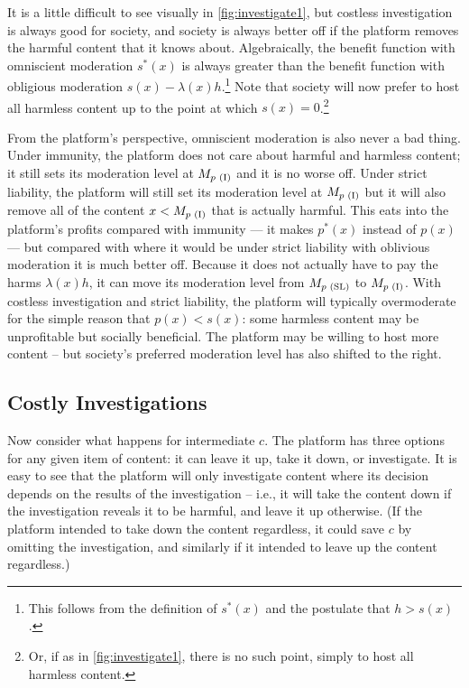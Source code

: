 It is a little difficult to see visually in \autoref{fig:investigate1}, but costless investigation is always good for society, and society is always better off if the platform removes the harmful content that it knows about. Algebraically, the  benefit function with omniscient moderation $s^*(x)$  is always greater than the benefit function with obligious moderation $s(x) - \lambda(x)h$.\footnote{This follows from the definition of $s^*(x)$ and the postulate that $h > s(x)$.} Note that society will now prefer to host all harmless content up to the point at which $s(x) = 0$.\footnote{Or, if as in \ref{fig:investigate1}, there is no such point, simply to host all harmless content.}

From the platform's perspective, omniscient moderation is also never a bad thing. Under immunity, the platform does not care about harmful and harmless content; it still sets its moderation level at $M_{p \text{ (I)}}$ and it is no worse off. Under strict liability, the platform will still set its moderation level at $M_{p \text{ (I)}}$ but it will also remove all of the content $x < M_{p \text{ (I)}}$ that is actually harmful. This eats into the platform's profits compared with immunity --- it makes $p^*(x)$ instead of  $p(x)$ --- but compared with where it would be under strict liability with oblivious moderation it is much better off. Because it does not actually have to pay the harms $\lambda(x)h$, it can move its moderation level from $M_{p \text{ (SL)}}$ to $M_{p \text{ (I)}}$. With costless investigation and strict liability, the platform will typically overmoderate for the simple reason that $p(x) < s(x)$: some harmless content may be unprofitable but socially beneficial. The platform may be willing to host more content -- but society's preferred moderation level has also shifted to the right.

\subsection{Costly Investigations}
\label{sec:investigate}

Now consider what happens for intermediate $c$. The platform has three options for any given item of content: it can leave it up, take it down, or investigate. It is easy to see that the platform will only investigate content where its decision depends on the results of the investigation -- i.e.,  it will take the content down if the investigation reveals it to be harmful, and leave it up otherwise. (If the platform intended to take down the content regardless, it could save $c$ by omitting the investigation, and similarly if it intended to leave up the content regardless.)

